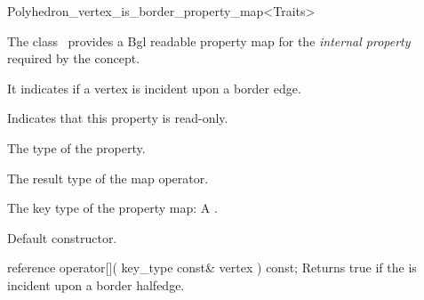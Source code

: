 

\begin{ccRefClass}{Polyhedron_vertex_is_border_property_map<Traits>}


\ccDefinition

The class \ccRefName\ provides a {\sc Bgl}
{readable property map} 
for the {\em internal property} 
required by the  concept.

It indicates if a  vertex is incident upon a border edge.



\ccTypes
    {Indicates that this property is read-only.}
  
    {The type of the property.}
    
    {The result type of the map operator.}
    
  {The key type of the property map: A .}

\ccCreation
{}  %

{Default constructor.}

\ccOperations

\ccMethod
  {reference operator[]( key_type const& vertex ) const;}
  {Returns true if the  is incident upon a border halfedge.}  
    
\ccIsModel
{} 

\end{ccRefClass}


